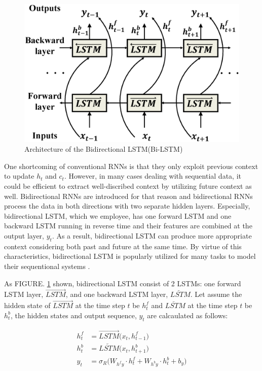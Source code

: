 \documentclass[letterpaper, 10 pt, conference]{ieeeconf}  %
\begin{document}
\begin{figure}[h!]
	\centering
	\includegraphics[width=.9\linewidth]{image/bidirectional_LSTM_revised}
	\caption{Architecture of the Bidirectional LSTM(Bi-LSTM)}
	\label{fig:bidirectional_revised}	
\end{figure}


One shortcoming of conventional RNNs is that they only exploit previous context to update $h_{t}$ and $c_{t}$. However, in many cases dealing with sequential data, it could be efficient to extract well-discribed context by utilizing future context as well. Bidirectional RNNs are introduced\cite{schuster1997bidirectional} for that reason and bidirectional RNNs process the data in both directions with two separate hidden layers. Especially, bidirectional LSTM, which we employee, has one forward LSTM and one backward LSTM running in reverse time and their features are combined at the output layer, $y_{t}$. As a result, bidirectional LSTM can produce more appropriate context considering both past and future at the same time. By virtue of this characteristics, bidirectional LSTM is popularly utilized for many tasks to model their sequentional systems \cite{zhang2017multi,li2018human,ullah2018action}. 


As FIGURE. \ref{fig:bidirectional_revised} shown, bidirectional LSTM consist of 2 LSTMs: one forward LSTM layer, $\overrightarrow{LSTM}$, and one backward LSTM layer, $\overleftarrow{LSTM}$. Let assume the hidden state of $\overrightarrow{LSTM}$ at the time step $t$  be $h^{f}_{t}$ and $\overleftarrow{LSTM}$ at the time step $t$  be $h^{b}_{t}$, the hidden states and output sequence, $y_{t}$ are calcaulated as follows:

\begin{align}
h^{f}_{t} & =\overrightarrow{LSTM}\big(x_{t}, h^{f}_{t-1}\big)\\
h^{b}_{t} & =\overleftarrow{LSTM}\big(x_{t}, h^{b}_{t+1}\big)\\
y_{t} & =\sigma _{R}\big(W_{h^{f}y}\cdot h^{f}_{t}+W_{h^{b}y}\cdot h^{b}_{t}+b_{y}\big)
\end{align}
\end{document}
